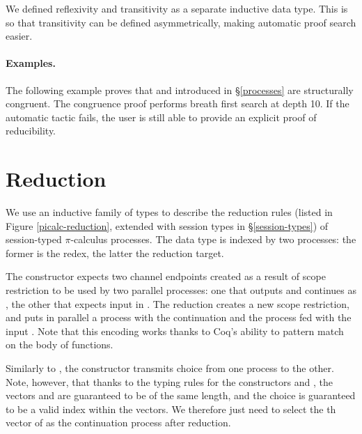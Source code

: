 \documentclass{mproj}
\newcommand{\picalc}{$\pi$-calculus}
\begin{document}
We defined reflexivity and transitivity as a separate inductive data type. This is so that transitivity can be defined asymmetrically, making automatic proof search easier.


\paragraph{Examples.}

The following example proves that  and  introduced in \S \ref{processes} are structurally congruent. The congruence proof performs breath first search at depth 10. If the automatic tactic fails, the user is still able to provide an explicit proof of reducibility.


\section{Reduction}\label{reduction}

We use an inductive family of types to describe the reduction rules (listed in Figure \ref{picalc-reduction}, extended with session types in \S \ref{session-types}) of session-typed \picalc{} processes. The data type is indexed by two processes: the former is the redex, the latter the reduction target. 


The  constructor expects two channel endpoints created as a result of scope restriction to be used by two parallel processes: one that outputs  and continues as , the other that expects input in . The reduction creates a new scope restriction, and puts in parallel a process with the continuation  and the process  fed with the input . Note that this encoding works thanks to Coq's ability to pattern match on the body of functions.


Similarly to , the  constructor transmits choice from one process to the other. Note, however, that thanks to the typing rules for the constructors  and , the vectors  and  are guaranteed to be of the same length, and the choice  is guaranteed to be a valid index within the vectors. We therefore just need to select the th vector of  as the continuation process after reduction.
\end{document}
